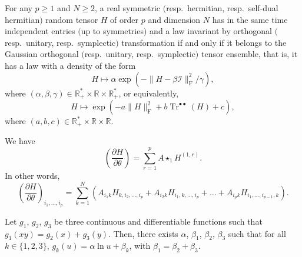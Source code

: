 \documentclass[10pt,a4paper]{amsart}
\begin{document}
\begin{Theorem}[main]\label{maxwell}
For any $p\geq 1$ and $N\geq 2$, a real symmetric $($resp.\ hermitian, resp.\ self-dual hermitian$)$ random tensor $H$ of order $p$ and dimension $N$ has in the same time independent entries $($up to symmetries$)$ and a law invariant by orthogonal $($resp.\ unitary, resp.\ symplectic$)$ transformation if and only if it belongs to the Gaussian orthogonal $($resp.\ unitary, resp.\ symplectic$)$ tensor ensemble, that is, it has a law with a density of the form
\[ H \mapsto \alpha \exp \left( - \| H - \beta \mathcal{I} \|_{\mathrm{F}}^2 / \gamma \right),\]
where $(\alpha,\beta,\gamma) \in \mathbb{R}^*_+ \times \mathbb{R} \times \mathbb{R}^*_+$,
or equivalently,
\[ H \mapsto \exp \left( - a \| H \|_{\mathrm{F}}^2 + b \operatorname{Tr}^{\bullet \bullet}(H) + c \right),\]
where $(a,b,c) \in \mathbb{R}^*_+ \times \mathbb{R} \times \mathbb{R}$.
\end{Theorem}

\begin{Proposition}\label{derivatives}
We have
    \[ \left( \frac{\partial H}{\partial \theta} \right) = \sum_{r=1}^p A \star_1 H^{(1,r)}. \]
In other words,
\[\left( \frac{\partial H}{\partial \theta} \right)_{i_1,\dots,i_p} = \sum_{k=1}^N (A_{i_1k}H_{k,i_2,\dots,i_p} + A_{i_2k}H_{i_1,k,\dots,i_p} + \dots + A_{i_pk}H_{i_1,\dots,i_{p-1},k}).\]
\end{Proposition}

\begin{Lemma}\label{xy}
Let $g_1$, $g_2$, $g_3$ be three continuous and differentiable functions such that
$ g_1(xy)=g_2(x)+g_3(y)$.
Then, there exists $\alpha$, $\beta_1$, $\beta_2$, $\beta_3$ such that for all $k\in \{1,2,3\}$,
$g_k(u)=\alpha \ln u + \beta_k$,
with $\beta_1 = \beta_2+\beta_3$.
\end{Lemma}
\end{document}
